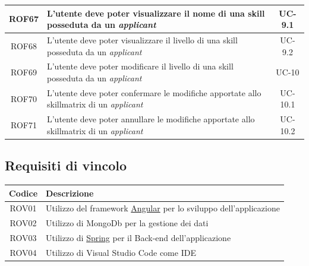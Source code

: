 \begin{center}
\begin{tabularx}{\textwidth}{|c|X|c|}
		\hline
		ROF67 & L'utente deve poter visualizzare il nome di una skill posseduta da un \textit{applicant} & UC-9.1 \\
		\hline
		ROF68 & L'utente deve poter visualizzare il livello di una skill posseduta da un \textit{applicant} & UC-9.2\\
		\hline
		ROF69 &L'utente deve poter modificare il livello di una skill posseduta da un \textit{applicant} &  UC-10\\
		\hline
		ROF70 &  L'utente deve poter confermare le modifiche apportate allo skillmatrix di un \textit{applicant}& UC-10.1\\
		\hline
		ROF71 & L'utente deve poter annullare le modifiche apportate allo skillmatrix di un \textit{applicant} & UC-10.2 \\
		\hline
	\end{tabularx}
\end{center}


\subsection{Requisiti di vincolo}
\begin{center}
	\begin{tabularx}{\textwidth}{|c|X|}
		\hline
		\textbf{Codice} & \textbf{Descrizione} \\
		\hline
		ROV01 & Utilizzo del \gls{framework} \hyperref[angular]{Angular} per lo sviluppo dell'applicazione\\
		\hline
		ROV02 & Utilizzo di MongoDb per la gestione dei dati\\
		\hline
		ROV03 & Utilizzo di \hyperref[tech-spring]{Spring} per il \gls{Back-end} dell'applicazione\\
		\hline
		ROV04 & Utilizzo di Visual Studio Code come \gls{IDE}\\
		\hline
	\end{tabularx}
\end{center}



